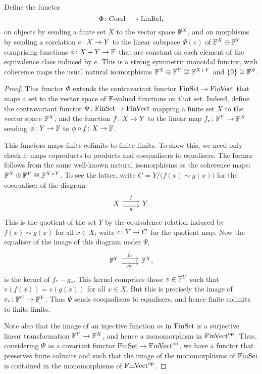 \begin{proposition}
  Define the functor 
  \[ 
    \Phi{\colon} \mathrm{Corel} \longrightarrow \mathrm{LinRel}, 
  \] 
  on objects by sending a finite set $X$ to the vector space ${\mathbb F}^X$, and on
  morphisms by sending a corelation $e{\colon} X \to Y$ to the linear subspace
  $\Phi(e)$ of ${\mathbb F}^X \oplus {\mathbb F}^Y$ comprising functions $\phi{\colon} X+Y \to {\mathbb F}$
  that are constant on each element of the equivalence class induced by
  $e$.  This is a strong symmetric monoidal functor, with coherence maps
  the usual natural isomorphisms ${\mathbb F}^X \oplus {\mathbb F}^Y \cong {\mathbb F}^{X + Y}$ and
  $\{0\} \cong {\mathbb F}^\varnothing$. 
\end{proposition}
\begin{proof}
This functor $\Phi$ extends the contravariant functor $\mathrm{FinSet} \to \mathrm{FinVect}$
that maps a set to the vector space of ${\mathbb F}$-valued functions on that set.
Indeed, define the contravariant functor $\Psi{\colon} \mathrm{FinSet} \to \mathrm{FinVect}$
mapping a finite set $X$ to the vector space ${\mathbb F}^X$, and the function $f{\colon} X
\to Y$ to the linear map $f_\ast{\colon} {\mathbb F}^Y \to {\mathbb F}^X$ sending $\phi{\colon} Y \to {\mathbb F}$
to $\phi \circ f{\colon} X \to {\mathbb F}$.

This functors maps finite colimits to finite limits. To show this, we need only
check it maps coproducts to products and coequalisers to equalisers. The former
follows from the same well-known natural isomorphisms as the coherence maps:
${\mathbb F}^X \oplus {\mathbb F}^Y \cong {\mathbb F}^{X\times Y}$. To see the latter, write $C = Y/\big(f(x)
\sim g(x)\big)$ for the coequaliser of the diagram 
\[
\begin{tikzcd}
X \ar[r,shift left=.75ex,"f"]
  \ar[r,shift right=.75ex,swap,"g"]
&
Y.
\end{tikzcd}
\]
This is the quotient of the set $Y$ by the equivalence relation induced by $f(x)
\sim g(x)$ for all $x \in X$; write $c{\colon} Y \to C$ for the quotient map.  Now
the equaliser of the image of this diagram under $\Psi$,
\[
\begin{tikzcd}
\F^Y \ar[r,shift left=.75ex,"f_\ast"]
  \ar[r,shift right=.75ex,swap,"g_\ast"]
&
\F^X,
\end{tikzcd}
\]
is the kernel of $f_\ast-g_\ast$. This kernel comprises those $v \in {\mathbb F}^Y$ such
that $v(f(x)) = v(g(x))$ for all $x \in X$. But this is precisely the image of
$c_\ast{\colon} {\mathbb F}^C \to {\mathbb F}^Y$. Thus $\Psi$ sends coequalisers to equalisers, and
hence finite colimits to finite limits.

Note also that the image of an injective function $m$ in $\mathrm{FinSet}$ is a
surjective linear transformation ${\mathbb F}^Y \to {\mathbb F}^X$, and hence a monomorphism in
$\mathrm{FinVect}^{\mathrm{op}}$. Thus, considering $\Psi$ as a covariant functor $\mathrm{FinSet} \to
\mathrm{FinVect}^{\mathrm{op}}$, we have a functor that preserves finite colimits and such that
the image of the monomorphisms of $\mathrm{FinSet}$ is contained in the monomorphisms of
$\mathrm{FinVect}^{\mathrm{op}}$.


\end{proof}

